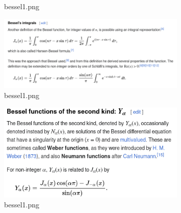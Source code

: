 \documentclass[12pt]{exam}
\begin{document}
\begin{enumerate}
\begin{figure}[H]
      \caption{bessel1.png}
      \label{fig:bessel4-png}
    \end{figure}
    \begin{figure}[H]
      \centering
      \includegraphics[width=0.8\textwidth]{bessel5.png}
      \caption{bessel1.png}
      \label{fig:bessel5-png}
    \end{figure}
    \begin{figure}[H]
      \centering
      \includegraphics[width=0.8\textwidth]{bessel6.png}
      \caption{bessel1.png}
      \label{fig:bessel6-png}
    \end{figure}


\end{enumerate}
\end{document}
